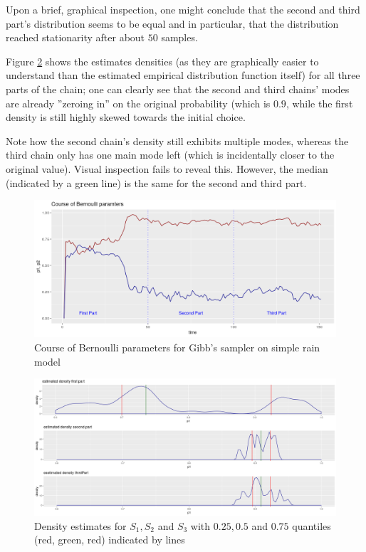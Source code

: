 Upon a brief, graphical inspection, one might conclude that the second and third part's distribution seems to be equal and in particular, that the distribution reached stationarity after about $50$ samples.  


Figure \ref{splitChainDensities} shows the estimates densities (as they are graphically easier to understand than the estimated empirical distribution function itself) for all three parts of the chain; one can clearly see that the second and third chains' modes are already ''zeroing in'' on the original probability (which is $0.9$, while the first density is still highly skewed towards the initial choice. 

Note how the second chain's density still exhibits multiple modes, whereas the third chain only has one main mode left (which is incidentally closer to the original value). Visual inspection fails to reveal this. However, the median (indicated by a green line) is the same for the second and third part. 


\begin{figure}
	\includegraphics[width=\linewidth]{Images/bernoulli_param_split.png}
	\caption{Course of Bernoulli parameters for Gibb's sampler on simple rain model}
	\label{splitChain}
\end{figure}

\begin{figure}
	\includegraphics[width=\linewidth]{Images/chain_parts_quantiles.png}
	\caption{Density estimates for $S_1, S_2$ and $S_3$ with $0.25, 0.5$ and $ 0.75$ quantiles (red, green, red) indicated by lines}
	\label{splitChainDensities}
\end{figure}

